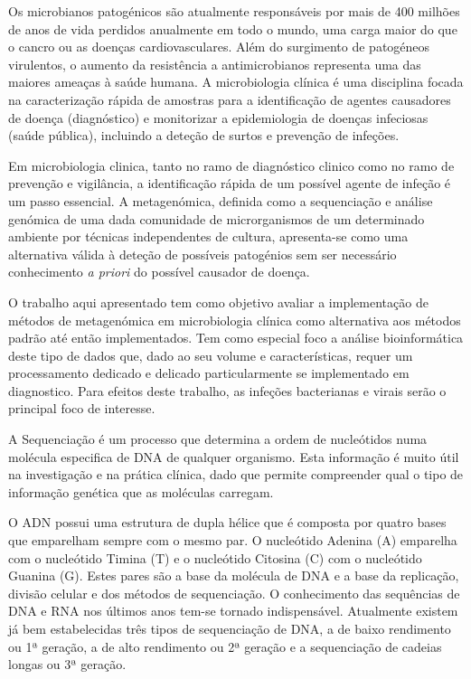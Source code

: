 Os microbianos patogénicos são atualmente responsáveis por mais de 400 milhões de anos de vida perdidos anualmente em todo o mundo, uma carga maior do que o cancro ou as doenças cardiovasculares. Além do surgimento de patogéneos virulentos, o aumento da resistência a antimicrobianos representa uma das maiores ameaças à saúde humana. A microbiologia clínica é uma disciplina focada na caracterização rápida de amostras para a identificação de agentes causadores de doença (diagnóstico) e monitorizar a epidemiologia de doenças infeciosas (saúde pública), incluindo a deteção de surtos e prevenção de infeções. 

Em microbiologia clinica, tanto no ramo de diagnóstico clinico como no ramo de prevenção e vigilância, a identificação rápida de um possível agente de infeção é um passo essencial. 
A metagenómica, definida como a sequenciação e análise genómica de uma dada comunidade de microrganismos de um determinado ambiente por técnicas independentes de cultura, apresenta-se como uma alternativa válida à deteção de possíveis patogénios sem ser necessário conhecimento \textit{a priori} do possível causador de doença.

O trabalho aqui apresentado tem como objetivo avaliar a implementação de métodos de metagenómica em microbiologia clínica como alternativa aos métodos padrão até então implementados. Tem como especial foco a análise bioinformática deste tipo de dados que, dado ao seu volume e características, requer um processamento dedicado e delicado particularmente se implementado em diagnostico. Para efeitos deste trabalho, as infeções bacterianas e virais serão o principal foco de interesse.  

A Sequenciação é um processo que determina a ordem de nucleótidos numa molécula especifica de DNA de qualquer organismo. Esta informação é muito útil na investigação e na prática clínica, dado que permite compreender qual o tipo de informação genética que as moléculas carregam. 

O ADN possui uma estrutura de dupla hélice que é composta por quatro bases que emparelham sempre com o mesmo par. O nucleótido Adenina (A) emparelha com o nucleótido Timina (T) e o nucleótido Citosina (C) com o nucleótido Guanina (G). Estes pares são a base da molécula de DNA e a base da replicação, divisão celular e dos métodos de sequenciação. O conhecimento das sequências de DNA e RNA nos últimos anos tem-se tornado indispensável. Atualmente existem já bem estabelecidas três tipos de sequenciação de DNA, a de baixo rendimento ou 1ª geração, a de alto rendimento ou 2ª geração e a sequenciação de cadeias longas ou 3ª geração.

